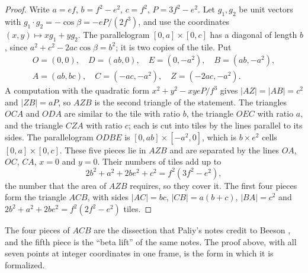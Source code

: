 \documentclass[11pt,reqno]{amsart}
\theoremstyle{plain}
\theoremstyle{definition}
\begin{document}
\begin{proof}
Write $a=ef$, $b=f^2-e^2$, $c=f^2$, $P=3f^2-e^2$. Let $g_1,g_2$ be unit vectors with
$g_1\cdot g_2=-\cos\beta=-eP/(2f^3)$, and use the coordinates $(x,y)\mapsto xg_1+yg_2$. The parallelogram
$[0,a]\times[0,c]$ has a diagonal of length $b$, since $a^2+c^2-2ac\cos\beta=b^2$; it is two copies of the
tile. Put
\begin{gather*}
O=(0,0),\quad D=(ab,0),\quad E=(0,-a^2),\quad B=(ab,-a^2),\\
A=(ab,bc),\quad C=(-ac,-a^2),\quad Z=(-2ac,-a^2).
\end{gather*}
A computation with the quadratic form $x^2+y^2-xyeP/f^3$ gives $|AZ|=|AB|=c^2$ and $|ZB|=aP$, so $AZB$ is
the second triangle of the statement. The triangles $OCA$ and $ODA$ are similar to the tile with ratio $b$,
the triangle $OEC$ with ratio $a$, and the triangle $CZA$ with ratio $c$; each is cut into tiles by the
lines parallel to its sides. The parallelogram $ODBE$ is $[0,ab]\times[-a^2,0]$, which is $b\times e^2$
cells $[0,a]\times[0,c]$. These five pieces lie in $AZB$ and are separated by the lines $OA$, $OC$, $CA$,
$x=0$ and $y=0$. Their numbers of tiles add up to
\[
2b^2+a^2+2be^2+c^2=f^2(3f^2-e^2),
\]
the number that the area of $AZB$ requires, so they cover it. The first four pieces form the triangle $ACB$,
with sides $|AC|=bc$, $|CB|=a(b+c)$, $|BA|=c^2$ and $2b^2+a^2+2be^2=f^2(2f^2-e^2)$ tiles.
\end{proof}

The four pieces of $ACB$ are the dissection that Paliy's notes \cite{PaliyLedger} credit to Beeson
\cite[Thm.~11]{BeesonIII}, and the fifth piece is the ``beta lift'' of the same notes. The proof above, with
all seven points at integer coordinates in one frame, is the form in which it is formalized.
\end{document}
